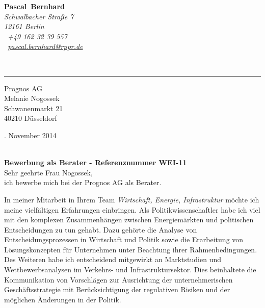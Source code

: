 \documentclass[11pt,a4paper]{article}
\def\firstname{Pascal}
\def\familyname{Bernhard}
\begin{document}
\sffamily   %
\hfill%
\begin{minipage}[t]{.6\textwidth}
	\raggedleft%
	{\bfseries {\color{firstnamecolor}\firstname}~{\color{familynamecolor}\familyname}}\\[.35ex]
	\small\itshape%
	Schwalbacher Straße 7\\
	12161 Berlin\\[.35ex]
	\Mobilefone~+49 162 32 39 557 \\
	\Letter~\href{mailto:pascal.bernhard@rppr.de}{pascal.bernhard@rppr.de}
\end{minipage}\\[0.5em]
%
{\color{firstnamecolor}\rule{\textwidth}{.25ex}}
%
\begin{minipage}[t]{.4\textwidth}
	\raggedright%
	\vspace*{1em}
	Prognos AG \\
	Melanie Nogossek\\[.35ex]
	\small%
	Schwanenmarkt 21\\
	40210 Düsseldorf
\end{minipage}
%
\hfill
%
\begin{minipage}[t]{.4\textwidth}
	. November 2014
\end{minipage}\\[1em]


{\bfseries \color{familynamecolor}Bewerbung als Berater - Referenznummer WEI-11}\\[0.75em]

Sehr geehrte Frau Nogossek,\\[0.5em]
%
ich bewerbe mich bei der Prognos AG als Berater.

In meiner Mitarbeit in Ihrem Team \textsl{Wirtschaft, Energie, Infrastruktur} möchte ich meine vielfältigen Erfahrungen einbringen. Als Politikwissenschaftler habe ich viel mit den komplexen Zusammen­hängen zwischen Energiemärkten und politischen Entscheidungen zu tun gehabt. Dazu gehörte die Analyse von Entscheidungsprozessen in Wirtschaft und Politik sowie die Erarbeitung von Lösungskonzepten für Unternehmen unter Beachtung ihrer Rahmenbedingungen. Des Weiteren habe ich entscheidend mitgewirkt an Marktstudien und Wettbewerbsanalysen im Verkehrs- und Infrastruktursektor. Dies beinhaltete die Kommunikation von Vorschlägen zur Ausrichtung der unter­neh­merischen Geschäfts­strategie mit Berücksichtigung der regulativen Risiken und der möglichen Änderungen in der Politik.
\end{document}
